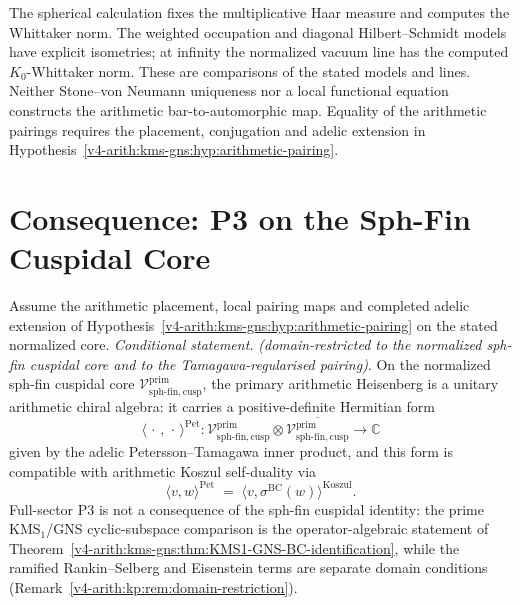 \begin{remark}
\label{v4-arith:kp:rem:non-circular}
The spherical calculation fixes the multiplicative Haar measure and
computes the Whittaker norm. The weighted occupation and diagonal
Hilbert--Schmidt models have explicit isometries; at infinity the
normalized vacuum line has the computed \(K_0\)-Whittaker norm.
These are comparisons of the stated models and lines. Neither
Stone--von Neumann uniqueness nor a local functional equation
constructs the arithmetic bar-to-automorphic map. Equality of the
arithmetic pairings requires the placement, conjugation and adelic
extension in Hypothesis~\ref{v4-arith:kms-gns:hyp:arithmetic-pairing}.
\end{remark}

\section{Consequence: P3 on the Sph-Fin Cuspidal Core}
\label{v4-arith:kp:P3-unconditional}

\begin{corollary}
\label{v4-arith:kp:cor:P3-unconditional}
Assume the arithmetic placement, local pairing maps and completed
adelic extension of Hypothesis~\ref{v4-arith:kms-gns:hyp:arithmetic-pairing}
on the stated normalized core.
\emph{Conditional statement.} \emph{(domain-restricted to the normalized
sph-fin cuspidal core and to the Tamagawa-regularised pairing)}. On the normalized sph-fin cuspidal core
\(\mathcal{V}^{\mathrm{prim}}_{\mathrm{sph\text{-}fin,cusp}}\),
the primary arithmetic Heisenberg is a unitary arithmetic chiral
algebra: it carries a positive-definite Hermitian form
\begin{equation}
\label{v4-arith:kp:eq:Pet-form}
\langle\,\cdot\,,\,\cdot\,\rangle^{\mathrm{Pet}}\colon\mathcal{V}^{\mathrm{prim}}_{\mathrm{sph\text{-}fin,cusp}}\otimes\overline{\mathcal{V}^{\mathrm{prim}}_{\mathrm{sph\text{-}fin,cusp}}}\to\mathbb{C}
\end{equation}
given by the adelic Petersson--Tamagawa inner product, and this
form is compatible with arithmetic Koszul self-duality via
\begin{equation}
\label{v4-arith:kp:eq:Pet-Koszul-compat}
\langle v,w\rangle^{\mathrm{Pet}}
\;=\;\langle v,\sigma^{\mathrm{BC}}(w)\rangle^{\mathrm{Koszul}}.
\end{equation}
Full-sector P3 is not a consequence of the sph-fin cuspidal identity:
the prime KMS\(_1\)/GNS cyclic-subspace comparison is the operator-algebraic statement
of Theorem~\ref{v4-arith:kms-gns:thm:KMS1-GNS-BC-identification}, while the
ramified Rankin--Selberg and Eisenstein terms are separate domain
conditions (Remark~\ref{v4-arith:kp:rem:domain-restriction}).
\end{corollary}

